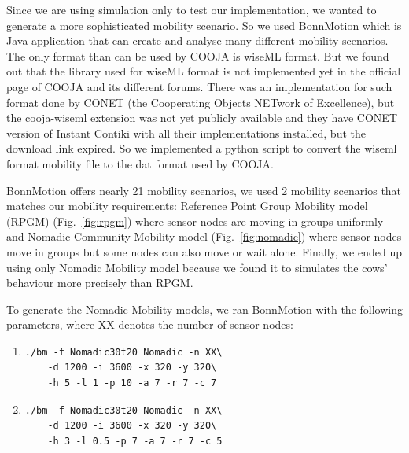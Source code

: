 \documentclass[conference]{IEEEtran}
\begin{document}
Since we are using simulation only to test our implementation, we wanted 
to generate a more sophisticated mobility scenario. So we used BonnMotion 
which is Java application that can create and analyse many different mobility 
scenarios. The only format than can be used by COOJA is wiseML format. 
But we found out that the library used  for wiseML format is not implemented 
yet in the official page of COOJA and its different forums. There was an 
implementation for such format done by CONET (the Cooperating Objects NETwork 
of Excellence), but the cooja-wiseml extension was not yet publicly available 
and they have CONET version of Instant Contiki with all their implementations 
installed, but the download link expired. So we implemented a python script to 
convert the wiseml format mobility file to the dat format used by COOJA. 

BonnMotion offers nearly 21 mobility scenarios, we used 2 mobility scenarios
that matches our mobility requirements: Reference Point Group Mobility model
(RPGM) (Fig.~\ref{fig:rpgm}) where sensor nodes are moving in groups uniformly
and Nomadic Community Mobility model (Fig.~\ref{fig:nomadic}) where sensor
nodes move in groups but some nodes can also move or wait alone. Finally, we
ended up using only Nomadic Mobility model because we found it to simulates the
cows’ behaviour more precisely than RPGM.

To generate the Nomadic Mobility models, we ran BonnMotion with the following
parameters, where XX denotes the number of sensor nodes:

\begin{enumerate}
    \item
        \begin{verbatim}
./bm -f Nomadic30t20 Nomadic -n XX\
    -d 1200 -i 3600 -x 320 -y 320\
    -h 5 -l 1 -p 10 -a 7 -r 7 -c 7
        \end{verbatim}
    \item
        \begin{verbatim}
./bm -f Nomadic30t20 Nomadic -n XX\
    -d 1200 -i 3600 -x 320 -y 320\
    -h 3 -l 0.5 -p 7 -a 7 -r 7 -c 5
        \end{verbatim}
\end{enumerate}
\end{document}
